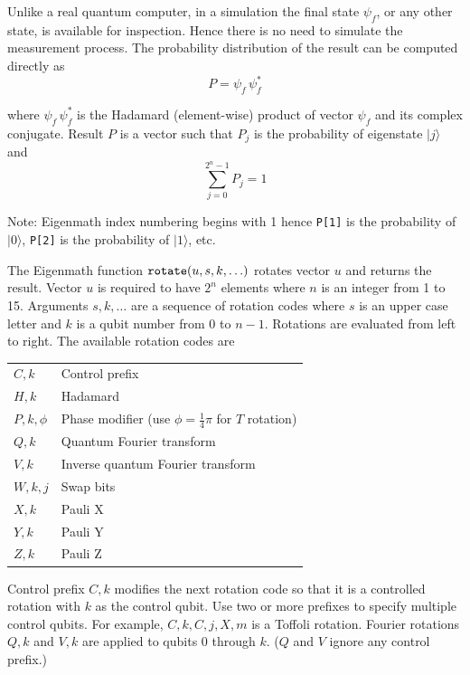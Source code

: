 \bigskip
Unlike a real quantum computer, in a simulation
the final state $\psi_f$, or any other state, is available for inspection.
Hence there is no need to simulate the measurement process.
The probability distribution of the result can be computed directly as
\begin{equation*}
P=\psi_f\,\psi_f^*
\end{equation*}

where $\psi_f\,\psi_f^*$
is the Hadamard (element-wise) product of vector $\psi_f$ and its complex conjugate.
Result $P$ is a vector such that $P_j$ is the
probability of eigenstate $|j\rangle$ and
\begin{equation*}
\sum_{j=0}^{2^n-1} P_j=1
\end{equation*}

Note: Eigenmath index numbering begins with 1 hence
\verb$P[1]$ is the probability of $|0\rangle$,
\verb$P[2]$ is the probability of $|1\rangle$, etc.

\bigskip
The Eigenmath function
$\text{\tt rotate}(u,s,k,\ldots)$
rotates vector $u$ and returns the result.
Vector $u$ is required to have $2^n$ elements where $n$ is an
integer from 1 to 15.
Arguments $s,k,\ldots$ are a sequence of rotation codes
where $s$ is an upper case letter and $k$ is a qubit number
from 0 to $n-1$.
Rotations are evaluated from left to right.
The available rotation codes are

\begin{center}
\begin{tabular}{ll}
$C,k$ & Control prefix
\\
$H,k$ & Hadamard
\\
$P,k,\phi$ & Phase modifier (use $\phi=\tfrac{1}{4}\pi$ for $T$ rotation)
\\
$Q,k$ & Quantum Fourier transform
\\
$V,k$ & Inverse quantum Fourier transform
\\
$W,k,j$ & Swap bits
\\
$X,k$ & Pauli X
\\
$Y,k$ & Pauli Y
\\
$Z,k$ & Pauli Z
\end{tabular}
\end{center}

Control prefix $C,k$ modifies the next rotation code so that it
is a controlled rotation with $k$ as the control qubit.
Use two or more prefixes to specify multiple control qubits.
For example, $C,k,C,j,X,m$ is a Toffoli rotation.
Fourier rotations $Q,k$ and $V,k$ are applied to qubits 0 through $k$.
($Q$ and $V$ ignore any control prefix.)

